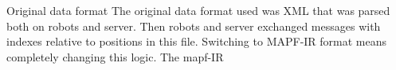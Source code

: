 \chap Original data format
The original data format used was XML that was parsed both on robots and server. Then robots and server exchanged messages with indexes relative to positions in this file. 
Switching to MAPF-IR format means completely changing this logic. The mapf-IR


